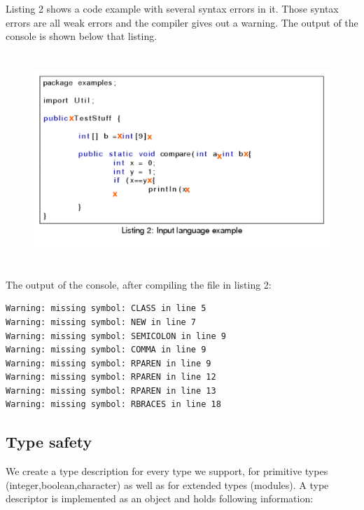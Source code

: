 Listing 2 shows a code example with several syntax errors in it. Those syntax errors are all weak errors and the compiler gives out a warning.
 The output of the console is shown below that listing.

\begin{figure}[h]
\label{synErrors}
\includegraphics[width=12.5cm,height=8cm]{images/synError.png}
\end{figure}

%
%
%
%	
%		
\newpage
The output of the console, after compiling the file in listing 2:
\begin{verbatim}
Warning: missing symbol: CLASS in line 5
Warning: missing symbol: NEW in line 7
Warning: missing symbol: SEMICOLON in line 9
Warning: missing symbol: COMMA in line 9
Warning: missing symbol: RPAREN in line 9
Warning: missing symbol: RPAREN in line 12
Warning: missing symbol: RPAREN in line 13
Warning: missing symbol: RBRACES in line 18
\end{verbatim}


\subsection {Type safety}
\label{labelTypeCheck}
We create a type description for every type we support, for primitive types (integer,boolean,character) as well as for extended types (modules).
A type descriptor is implemented as an object and holds following information: 

